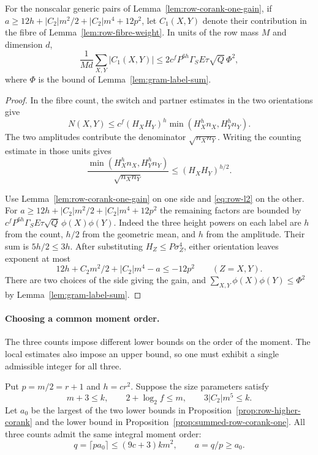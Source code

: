 \begin{proposition}\label{prop:summed-row-corank-one}
For the nonscalar generic pairs of Lemma~\ref{lem:row-corank-one-gain},
if \(a\ge12h+|C_2|m^2/2+|C_2|m^4+12p^2\), let \(C_1(X,Y)\) denote their contribution in the fibre of Lemma~\ref{lem:row-fibre-weight}. In units of the row mass \(M\) and dimension \(d\),
\[
       \frac{1}{Md}\sum_{X,Y}|C_1(X,Y)|\le 2c^fP^{6h}\Gamma_S E\tau\sqrt Q\,\Phi^2,
\]
where \(\Phi\) is the bound of Lemma~\ref{lem:gram-label-sum}.
\end{proposition}
\begin{proof}
In the fibre count, the switch and partner estimates in the
two orientations give
\[
 N(X,Y)\le c^f(H_XH_Y)^h\min(H_X^h n_X,H_Y^h n_Y).
\]
The two amplitudes contribute the denominator \(\sqrt{n_Xn_Y}\).
Writing the counting estimate in those units gives
\[
 \frac{\min(H_X^h n_X,H_Y^h n_Y)}{\sqrt{n_Xn_Y}}
              \le (H_XH_Y)^{h/2}.
\]

Use Lemma~\ref{lem:row-corank-one-gain} on one side and
\eqref{eq:row-l2} on the other. For
\(a\ge12h+|C_2|m^2/2+|C_2|m^4+12p^2\) the remaining factors
are bounded by \(c^fP^{6h}\Gamma_S E\tau\sqrt Q\,\phi(X)\phi(Y)\).
Indeed the three height powers on each label are \(h\) from the
count, \(h/2\) from the geometric mean, and \(h\) from the
amplitude. Their sum is \(5h/2\le3h\). After substituting
\(H_Z\le P\sigma_Z^4\), either orientation leaves exponent at most
\[
   12h+C_2m^2/2+|C_2|m^4-a\le-12p^2
   \qquad(Z=X,Y).
\]
There are two choices of the side giving the gain, and
\(\sum_{X,Y}\phi(X)\phi(Y)\le\Phi^2\) by
Lemma~\ref{lem:gram-label-sum}.
\end{proof}

\paragraph{Choosing a common moment order.}

The three counts impose different lower bounds on the order of the moment. The local estimates also impose an upper bound, so one must exhibit a single admissible integer for all three.

\begin{lemma}\label{lem:row-moment-budget}
Put \(p=m/2=r+1\) and \(h=cr^2\). Suppose the size parameters satisfy
\[
 m+3\le k,\qquad 2+\log_2 f\le m,\qquad 3|C_2|m^5\le k .
\]
Let \(a_0\) be the largest of the two lower bounds in
Proposition~\ref{prop:row-higher-corank} and the lower bound in
Proposition~\ref{prop:summed-row-corank-one}. All three counts admit the same integral moment order:
\[
 q=\lceil p a_0\rceil\le(9c+3)km^2,\qquad a=q/p\ge a_0 .
\]
\end{lemma}

